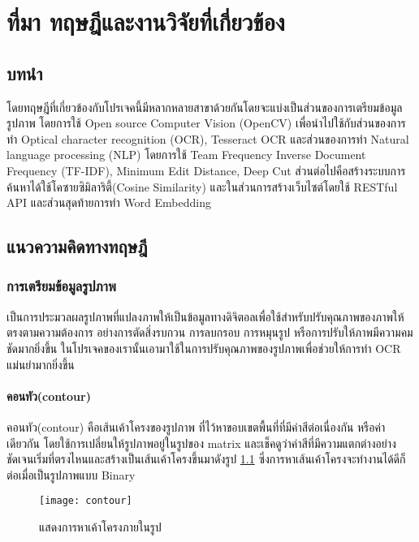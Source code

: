 \chapter{ที่มา ทฤษฎีและงานวิจัยที่เกี่ยวข้อง}
\section{บทนำ}

โดยทฤษฎีที่เกี่ยวข้องกับโปรเจคนี้มีหลากหลายสาขาด้วยกันโดยจะแบ่งเป็นส่วนของการเตรียมข้อมูลรูปภาพ โดยการใช้ Open source Computer Vision (OpenCV) เพื่อนำไปใช้กับส่วนของการทำ Optical character recognition (OCR), Tesseract OCR และส่วนของการทำ Natural language processing (NLP) โดยการใช้ Team Frequency Inverse Document Frequency (TF-IDF), Minimum Edit Distance,  Deep Cut ส่วนต่อไปคือสร้างระบบการค้นหาได้ใช้โคซายซิมิลาริตี้(Cosine Similarity) และในส่วนการสร้างเว็บไซต์โดยใช้ RESTful API และส่วนสุดท้ายการทำ Word Embedding 

\section{แนวความคิดทางทฤษฎี}

\subsection{การเตรียมข้อมูลรูปภาพ}

เป็นการประมวลผลรูปภาพที่แปลงภาพให้เป็นข้อมูลทางดิจิตอลเพื่อใช้สำหรับปรับคุณภาพของภาพให้ตรงตามความต้องการ อย่างการตัดสิ่งรบกวน การลบกรอบ การหมุนรูป หรือการปรับให้ภาพมีความคมชัดมากยิ่งขึ้น ในโปรเจคของเรานั้นเอามาใช้ในการปรับคุณภาพของรูปภาพเพื่อช่วยให้การทำ OCR แม่นยำมากยิ่งขึ้น 

\subsubsection{คอนทัว(contour)}

คอนทัว(contour) \cite{doxygen} คือเส้นเค้าโครงของรูปภาพ ที่ไว้หาขอบเขตพื้นที่ที่มีค่าสีต่อเนื่องกัน หรือค่าเดียวกัน โดยใช้การเปลี่ยนให้รูปภาพอยู่ในรูปของ matrix และเช็คดูว่าค่าสีที่มีความแตกต่างอย่างชัดเจนเริ่มที่ตรงไหนและสร้างเป็นเส้นเค้าโครงขึ้นมาดังรูป \ref{fig:contour} ซึ่งการหาเส้นเค้าโครงจะทำงานได้ดีก็ต่อเมื่อเป็นรูปภาพแบบ Binary 

\begin{figure}[!h]
    \centering
    \texttt{[image: contour]}
    \caption{แสดงการหาเค้าโครงภายในรูป}\label{fig:contour}
\end{figure}

